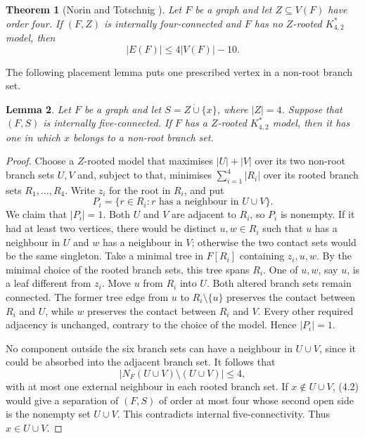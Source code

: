 \documentclass[11pt]{amsart}
\newtheorem{theorem}{Theorem}[section]
\newtheorem{lemma}[theorem]{Lemma}
\begin{document}
\begin{theorem}[Norin and Totschnig {\cite[Lemma~12]{NorinTotschnig2025}}]
\label{thm:rooted-two-helper-bound}
Let $F$ be a graph and let $Z\subseteq V(F)$ have order four.  If $(F,Z)$
is internally four-connected and $F$ has no $Z$-rooted $K^*_{4,2}$ model,
then
\[
        |E(F)|\leq4|V(F)|-10.                          \tag{4.1}
\]
\end{theorem}

The following placement lemma puts one prescribed vertex in a non-root
branch set.

\begin{lemma}\label{lem:fifth-root-helper}
Let $F$ be a graph and let $S=Z\mathbin{\dot\cup}\{x\}$, where $|Z|=4$.
Suppose that $(F,S)$ is internally five-connected.  If $F$ has a
$Z$-rooted $K^*_{4,2}$ model, then it has one in which $x$ belongs to a
non-root branch set.
\end{lemma}

\begin{proof}
Choose a $Z$-rooted model that maximises $|U|+|V|$ over its two non-root
branch sets $U,V$ and, subject to that, minimises
$\sum_{i=1}^4|R_i|$ over its rooted branch sets $R_1,\ldots,R_4$.  Write
$z_i$ for the root in $R_i$, and put
\[
        P_i=\{r\in R_i:r\text{ has a neighbour in }U\cup V\}.
\]
We claim that $|P_i|=1$.  Both $U$ and $V$ are adjacent to $R_i$, so $P_i$ is
nonempty.  If it had at least two vertices, there would be distinct
$u,w\in R_i$ such that $u$ has a neighbour in $U$ and $w$ has a neighbour in $V$; otherwise the two
contact sets would be the same singleton.  Take a minimal tree in
$F[R_i]$ containing $z_i,u,w$.  By the minimal choice of the rooted branch
sets, this tree spans $R_i$.  One of $u,w$, say $u$, is a leaf different
from $z_i$.  Move $u$ from $R_i$ into $U$.  Both altered branch sets remain
connected.  The former tree edge from $u$ to $R_i\setminus\{u\}$ preserves
the contact between $R_i$ and $U$, while $w$ preserves the contact between
$R_i$ and $V$.  Every other required adjacency is unchanged, contrary to
the choice of the model.  Hence $|P_i|=1$.

No component outside the six branch sets can have a neighbour in
$U\cup V$, since it could be absorbed into the adjacent branch set.  It follows that
\[
        |N_F(U\cup V)\setminus(U\cup V)|\leq4,          \tag{4.2}
\]
with at most one external neighbour in each rooted branch set.  If
$x\notin U\cup V$, (4.2) would give a separation of $(F,S)$ of order at
most four whose second open side is the nonempty set $U\cup V$.  This
contradicts internal five-connectivity.  Thus $x\in U\cup V$.
\end{proof}
\end{document}
